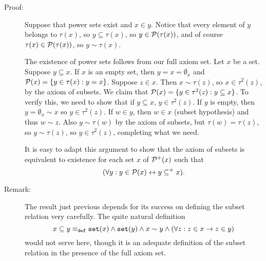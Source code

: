 \documentclass[12pt]{article}
\begin{document}
\begin{description}
\item[Proof:]  Suppose that power sets exist and $x \in y$.  Notice that every element of $y$ belongs to $\tau(x)$, so $y \subseteq \tau(x)$, so $y \in {\cal P}(\tau(x))$, and of course $\tau(x) \in {\cal P}(\tau(x))$, so $y \sim \tau(x)$.

The existence of power sets follows from our full axiom set.  Let $x$ be a set.  Suppose $y \subseteq x$.
If $x$ is an empty set, then $y=x=\emptyset_x$ and ${\cal P}(x) = \{y \in \tau(x):y=x\}$.  Suppose $z \in x$.  Then $x \sim \tau(z)$, so $x \in \tau^2(z)$, by the axiom of subsets.  We claim that ${\cal P}(x) = \{y \in \tau^2(z):y \subseteq x\}$.  To verify this, we need to show that if $y \subseteq x$, $y \in \tau^2(z)$.  If $y$ is empty, then $y = \emptyset_x \sim x$ so $y \in \tau^2(z)$.  If $w \in y$, then $w \in x$ (subset hypothesis) and thus $w \sim z$.  Also $y \sim \tau(w)$ by the axiom of subsets, but $\tau(w)=\tau(z)$, so $y \sim \tau(z)$, so $y \in \tau^2(z)$, completing what we need.

It is easy to adapt this argument to show that the axiom of subsets is equivalent to existence for each set $x$ of ${\cal P}^+(x)$  such that $$(\forall y:y \in {\cal P}(x)\leftrightarrow y \subseteq^+ x).$$

\item[Remark:]  The result just previous depends for its success on defining the subset relation very carefully.  The quite natural definition $$x \subseteq y \equiv_{\tt def} {\tt set}(x) \wedge {\tt set}(y) \wedge x \sim y \wedge (\forall z:z \in x \rightarrow z \in y)$$ would not serve here, though it is an adequate definition of the subset relation in the presence of the full axiom set.


\end{description}
\end{document}

